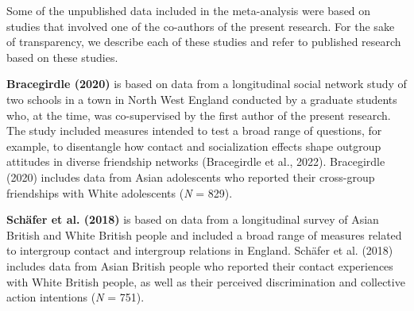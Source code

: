 \documentclass[12pt, letterpaper]{article}
\begin{document}
Some of the unpublished data included in the meta-analysis were based on
studies that involved one of the co-authors of the present research. For
the sake of transparency, we describe each of these studies and refer to
published research based on these studies.

\textbf{Bracegirdle (2020)} is based on data from a longitudinal social
network study of two schools in a town in North West England conducted
by a graduate students who, at the time, was co-supervised by the first
author of the present research. The study included measures intended to
test a broad range of questions, for example, to disentangle how contact
and socialization effects shape outgroup attitudes in diverse friendship
networks (Bracegirdle et al., 2022). Bracegirdle (2020) includes data
from Asian adolescents who reported their cross-group friendships with
White adolescents (\emph{N} = 829).

\textbf{Schäfer et al. (2018)} is based on data from a longitudinal
survey of Asian British and White British people and included a broad
range of measures related to intergroup contact and intergroup relations
in England. Schäfer et al. (2018) includes data from Asian British
people who reported their contact experiences with White British people,
as well as their perceived discrimination and collective action
intentions (\emph{N} = 751).
\end{document}
